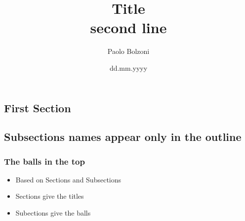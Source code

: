 \documentclass{beamer}
\title{Title \\ second line}
\author{Paolo Bolzoni}
\institute{Instititute}
\date{dd.mm.yyyy}
\begin{document}
\begin{frame}
    \maketitle
\end{frame}



\begin{frame}

\section{First Section}
\subsection{Subsections names appear only in the outline}

\frametitle{The balls in the top}

\begin{itemize}
    \item Based on Sections and Subsections
    \item Sections give the titles
    \item Subections give the balls
\end{itemize}

\end{frame}
\end{document}
